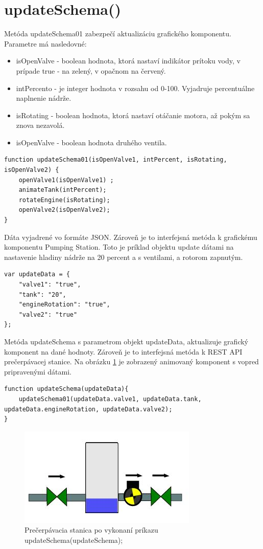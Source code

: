 \section{updateSchema()}

Metóda updateSchema01 zabezpečí aktualizáciu grafického komponentu. Parametre má nasledovné: 
\begin{itemize}
\item isOpenValve - boolean hodnota, ktorá nastaví indikátor prítoku vody, v prípade true - na zelený, v opačnom na červený. 
\item intPercento - je integer hodnota v rozsahu od 0-100. Vyjadruje percentuálne naplnenie nádrže. 
\item isRotating - boolean hodnota, ktorá nastaví otáčanie motora, až pokým sa znova nezavolá. 
\item isOpenValve - boolean hodnota druhého ventila. 
	
\end{itemize}

\begin{lstlisting}
function updateSchema01(isOpenValve1, intPercent, isRotating, isOpenValve2) {
	openValve1(isOpenValve1) ;
	animateTank(intPercent);
	rotateEngine(isRotating);
	openValve2(isOpenValve2);
}
\end{lstlisting}

Dáta vyjadrené vo formáte \ac*{JSON}. Zároveň je to interfejsná metóda k grafickému komponentu Pumping Station. Toto je príklad objektu update dátami na nastavenie hladiny nádrže na 20 percent a s ventilami, a rotorom zapnutým.  
\begin{lstlisting}
var updateData = {
	"valve1": "true",
	"tank": "20",
	"engineRotation": "true",
	"valve2": "true"
};
\end{lstlisting}
Metóda updateSchema s parametrom objekt updateData, aktualizuje grafický komponent na dané hodnoty. Zároveň je  to interfejsná metóda k REST API prečerpávacej stanice. Na obrázku \ref{fig:updateSchema} je zobrazený animovaný komponent s vopred pripravenými dátami. 
\begin{lstlisting}
function updateSchema(updateData){
	updateSchema01(updateData.valve1, updateData.tank, updateData.engineRotation, updateData.valve2);
}
\end{lstlisting}


\begin{figure}[H]
\centering
\includegraphics[width=0.7\linewidth]{obrazky/updateSchema}
\caption{Prečerpávacia stanica po vykonaní príkazu updateSchema(updateSchema);}
\label{fig:updateSchema}
\end{figure}